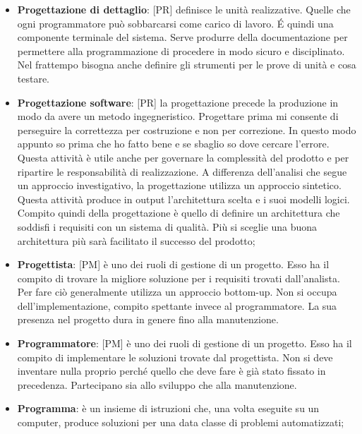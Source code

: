 \begin{itemize}
	\item \textbf{Progettazione di dettaglio}: [PR] definisce le unità realizzative. Quelle che ogni programmatore può sobbarcarsi come carico di lavoro. \'E quindi una componente terminale del sistema. Serve produrre della documentazione per permettere alla programmazione di procedere in modo sicuro e disciplinato. Nel frattempo bisogna anche definire gli strumenti per le prove di unità e cosa testare.

	\item \textbf{Progettazione software}: [PR] la progettazione precede la produzione in modo da avere un metodo ingegneristico. Progettare prima mi consente di perseguire la correttezza per costruzione e non per correzione. In questo modo appunto so prima che ho fatto bene e se sbaglio so dove cercare l'errore. Questa attività è utile anche per governare la complessità del prodotto e per ripartire le responsabilità di realizzazione. \newline
	A differenza dell'analisi che segue un approccio investigativo, la progettazione utilizza un approccio sintetico. Questa attività produce in output l'architettura scelta e i suoi modelli logici. \newline
	Compito quindi della progettazione è quello di definire un architettura che soddisfi i requisiti con un sistema di qualità. Più si sceglie una buona architettura più sarà facilitato il successo del prodotto;

	\item \textbf{Progettista}: [PM] è uno dei ruoli di gestione di un progetto. \newline
	Esso ha il compito di trovare la migliore soluzione per i requisiti trovati dall'analista. Per fare ciò generalmente utilizza un approccio bottom-up. \newline
Non si occupa dell'implementazione, compito spettante invece al programmatore. La sua presenza nel progetto dura in genere fino alla manutenzione.
	
	\item \textbf{Programmatore}: [PM] è uno dei ruoli di gestione di un progetto. 	\newline
Esso ha il compito di implementare le soluzioni trovate dal progettista. Non si deve inventare nulla proprio perché quello che deve fare è già stato fissato in precedenza. Partecipano sia allo sviluppo che alla manutenzione.

	\item \textbf{Programma}: è un insieme di istruzioni che, una volta eseguite su un computer, produce soluzioni per una data classe di problemi automatizzati;


\end{itemize}
